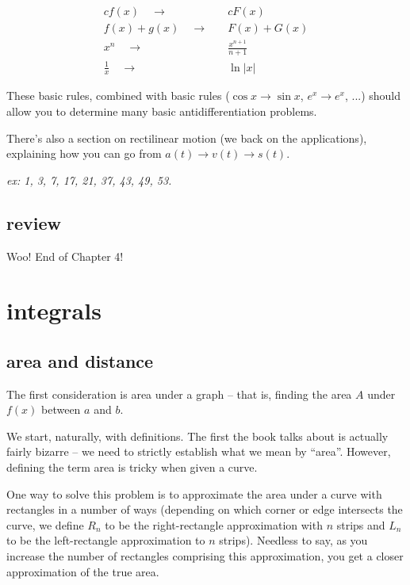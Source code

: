 \documentclass[10pt,a4paper]{report}
\begin{document}
\begin{align*}
	cf(x) \quad \to & \quad cF(x) \\
	f(x) + g(x) \quad \to & \quad F(x) + G(x) \\
	x^n \quad \to & \quad \frac{x^{n+1}}{n + 1} \\
	\frac{1}{x} \quad \to & \quad \ln|x|
\end{align*}

These basic rules, combined with basic rules ($\cos x \to \sin x$, $e^x \to e^x$, ...) should allow you to determine many basic antidifferentiation problems.

There's also a section on rectilinear motion (we back on the applications), explaining how you can go from $a(t) \to v(t) \to s(t)$.


\emph{ex: 1, 3, 7, 17, 21, 37, 43, 49, 53.}

\section*{review}

Woo! End of Chapter 4!



























\chapter{integrals}

\section{area and distance}

The first consideration is area under a graph -- that is, finding the area $A$ under $f(x)$ between $a$ and $b$.

We start, naturally, with definitions. The first the book talks about is actually fairly bizarre -- we need to strictly establish what we mean by ``area''. However, defining the term area is tricky when given a curve.

One way to solve this problem is to approximate the area under a curve with rectangles in a number of ways (depending on which corner or edge intersects the curve, we define $R_n$ to be the right-rectangle approximation with $n$ strips and $L_n$ to be the left-rectangle approximation to $n$ strips). Needless to say, as you increase the number of rectangles comprising this approximation, you get a closer approximation of the true area.
\end{document}
